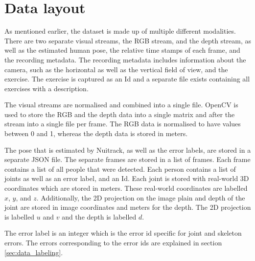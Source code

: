\section{Data layout}

As mentioned earlier, the dataset is made up of multiple different modalities. There are two separate visual streams, the RGB stream, and the depth stream, as well as the estimated human pose, the relative time stamps of each frame, and the recording metadata. The recording metadata includes information about the camera, such as the horizontal as well as the vertical field of view, and the exercise. The exercise is captured as an Id and a separate file exists containing all exercises with a description.

The visual streams are normalised and combined into a single file. OpenCV is used to store the RGB and the depth data into a single matrix and after the stream into a single file per frame. The RGB data is normalised to have values between 0 and 1, whereas the depth data is stored in meters.

The pose that is estimated by Nuitrack, as well as the error labels, are stored in a separate JSON file. The separate frames are stored in a list of frames. Each frame contains a list of all people that were detected. Each person contains a list of joints as well as an error label, and an Id. Each joint is stored with real-world 3D coordinates which are stored in meters. These real-world coordinates are labelled $x$, $y$, and $z$. Additionally, the 2D projection on the image plain and depth of the joint are stored in image coordinates and meters for the depth. The 2D projection is labelled $u$ and $v$ and the depth is labelled $d$. 

The error label is an integer which is the error id specific for joint and skeleton errors. The errors corresponding to the error ids are explained in section \ref{sec:data_labeling}.
